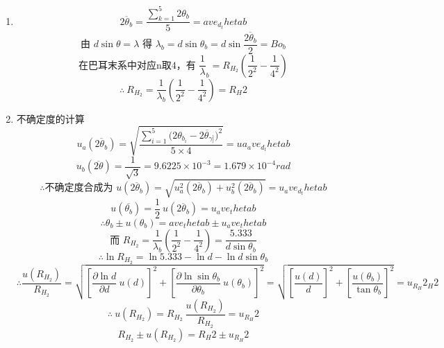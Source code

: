 \begin{enumerate}
  \item { }
      $$\overline{2{\theta}_b} = \displaystyle\frac{\sum_{k=1}^5 2{\theta}_b}{5} = {{ave_d_thetab}}$$
      $$\displaystyle\text{由\ }d\sin{\theta} = {\lambda}\text{\ 得\ }{\lambda}_b = d\sin{\theta}_b = d\sin{\frac{\overline{2{\theta}_b}}{2}} = {{Bo_b}}$$
      $$\displaystyle\text{在巴耳末系中对应n取4，有\ }\frac{1}{\lambda}_b = R_{H_2}\left(\frac{1}{2^2}-\frac{1}{4^2}\right)$$
      $$\therefore\ \displaystyle R_{H_2} = \frac{1}{ {\lambda}_b}\left(\frac{1}{2^2}-\frac{1}{4^2}\right) = {{R_H2}}$$
  \item {不确定度的计算}
      $$u_a(\overline{2{\theta}_b}) = \displaystyle\sqrt{\frac{\sum_{i=1}^5{(2{\theta}_{b_{i}}-\overline{2{\theta}_{\gamma]}}})^2}{5\times4}}={{ua_ave_d_thetab}}$$
      $$u_b(\overline{2\theta}) = \displaystyle\frac{1}{\sqrt3} = 9.6225\times10^{-3} = 1.679 \times 10^{-4} rad$$
      $$\therefore\text{不确定度合成为\ }u(\overline{2{\theta}_b}) = \sqrt{u_a^2(\overline{2{\theta}_b})+u_b^2(\overline{2{\theta}_b})} = {{u_ave_d_thetab}}$$
      $$u(\overline{ {\theta}_b})= \displaystyle\frac12\ u(\overline{2{\theta}_b}) = {{u_ave_thetab}}$$
      $$\therefore{\theta}_b \pm u({\theta}_b) = {{ave_thetab}} \pm {{u_ave_thetab}}$$
      $$\text{而\ }\displaystyle R_{H_2} = \frac{1}{ {\lambda}_b}\left(\frac{1}{2^2}-\frac{1}{4^2}\right) = \frac{5.333}{d\sin{\theta}_b}$$
      $$\therefore\ln{R_{H_2}} = \ln{5.333} -\ln{d} - \ln{d\sin{\theta}_b}$$
      $$\therefore\displaystyle \frac{u(R_{H_2})}{R_{H_2}} = \sqrt{ {\left[\frac{\partial{\ln{d}}}{\partial{d}}\ u(d)\right]}^2 + {\left[\frac{\partial{\ln{\sin{ {\theta}_b}}}}{\partial{ {\theta}_b}}\ u({\theta}_b)\right]}^2} = \sqrt{ {\left[\frac{u(d)}{d}\right]}^2 + {\left[\frac{u({\theta}_b)}{\tan{ {\theta}_b}}\right]}^2} = {{u_R_H2_H2}}$$
      $$\therefore \ u(R_{H_2}) = \displaystyle R_{H_2}\ \frac{u(R_{H_2})}{R_{H_2}} = {{u_R_H2}}$$ 
      $$R_{H_2} \pm u(R_{H_2}) = {{R_H2}} \pm {{u_R_H2}}$$
\end{enumerate}

